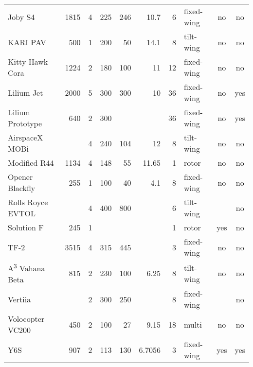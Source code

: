 {\begin{table}[h]
\begin{tabular}{l|rrrrrrlcc}
Joby S4          & 1815          & 4   & 225               & 246            & 10.7             & 6     & fixed-wing    & no      & no     \\
KARI PAV          & 500           & 1   & 200               & 50             & 14.1             & 8     & tilt-wing     & no      & no     \\
Kitty Hawk Cora  & 1224          & 2   & 180               & 100            & 11               & 12    & fixed-wing    & no      & no     \\
Lilium Jet \footnotemark      & 2000          & 5   & 300               & 300            & 10               & 36    & fixed-wing    & no      & yes    \\
Lilium Prototype & 640           & 2   & 300               &                &                  & 36    & fixed-wing    & no      & yes    \\
AirspaceX MOBi             &               & 4   & 240               & 104            & 12               & 8     & tilt-wing     & no      & no     \\
Modified R44     & 1134          & 4   & 148               & 55             & 11.65            & 1     & rotor         & no      & no     \\
Opener Blackfly \footnotemark & 255           & 1   & 100               & 40             & 4.1              & 8     & fixed-wing    & no      & no     \\
Rolls Royce EVTOL         &               & 4   & 400               & 800            &                  & 6     & tilt-wing     &         & no     \\
Solution F       & 245           & 1   &                   &                &                  & 1     & rotor        & yes     & no     \\
TF-2             & 3515          & 4   & 315               & 445            &                  & 3     & fixed-wing    & no      & no     \\
A\textsuperscript{3} Vahana Beta      & 815           & 2   & 230               & 100            & 6.25             & 8     & tilt-wing     & no      & no     \\
Vertiia          &               & 2   & 300               & 250            &                  & 8     & fixed-wing    &         & no     \\
Volocopter VC200       & 450           & 2   & 100               & 27             & 9.15             & 18    & multi         & no      & no     \\
Y6S              & 907           & 2   & 113               & 130            & 6.7056           & 3     & fixed-wing    & yes     & yes   
\end{tabular}
\end{table}
}




